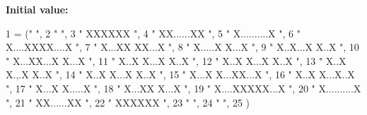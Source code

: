 {\bfseries Initial value\+:}
\begin{DoxyCode}
1 =  (\textcolor{stringliteral}{"                        "},
2          \textcolor{stringliteral}{"                        "},
3          \textcolor{stringliteral}{"         XXXXXX         "},
4          \textcolor{stringliteral}{"       XX......XX       "},
5          \textcolor{stringliteral}{"      X..........X      "},
6          \textcolor{stringliteral}{"     X....XXXX....X     "},
7          \textcolor{stringliteral}{"    X...XX    XX...X    "},
8          \textcolor{stringliteral}{"   X.....X      X...X   "},
9          \textcolor{stringliteral}{"   X..X...X      X..X   "},
10          \textcolor{stringliteral}{"  X...XX...X     X...X  "},
11          \textcolor{stringliteral}{"  X..X  X...X     X..X  "},
12          \textcolor{stringliteral}{"  X..X   X...X    X..X  "},
13          \textcolor{stringliteral}{"  X..X    X.,.X   X..X  "},
14          \textcolor{stringliteral}{"  X..X     X...X  X..X  "},
15          \textcolor{stringliteral}{"  X...X     X...XX...X  "},
16          \textcolor{stringliteral}{"   X..X      X...X..X   "},
17          \textcolor{stringliteral}{"   X...X      X.....X   "},
18          \textcolor{stringliteral}{"    X...XX     X...X    "},
19          \textcolor{stringliteral}{"     X....XXXXX...X     "},
20          \textcolor{stringliteral}{"      X..........X      "},
21          \textcolor{stringliteral}{"       XX......XX       "},
22          \textcolor{stringliteral}{"         XXXXXX         "},
23          \textcolor{stringliteral}{"                        "},
24          \textcolor{stringliteral}{"                        "},
25         )
\end{DoxyCode}
